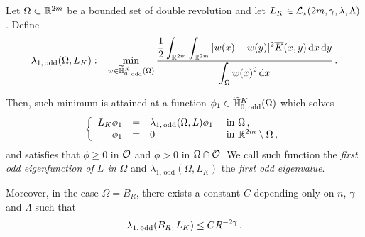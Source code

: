 \begin{lemma}
	\label{Lemma:FirstOddEigenfunction}
	Let $\Omega\subset \mathbb{R}^{2m} $ be a bounded set of double revolution and let $L_K\in \mathcal{L}_\star(2m,\gamma,\lambda, \Lambda)$. Define 
	\begin{equation}
	\label{Eq:DefLambda1}
	\lambda_{1, \, \mathrm{odd}}(\Omega, L_K) := \min_{w \in \widetilde{\mathbb{H}}^K_{0, \, \mathrm{odd}}(\Omega)} \dfrac{\dfrac{1}{2}  \displaystyle\int_{\mathbb{R}^{2m}} \int_{\mathbb{R}^{2m}} |w(x) - w(y)|^2 \overline{K}(x,y) \,\mathrm{d} x \,\mathrm{d} y}{ \displaystyle \int_\Omega w(x)^2 \,\mathrm{d} x}\,.
	\end{equation}
	
	Then, such minimum is attained at a function $\phi_1\in \widetilde{\mathbb{H}}^K_{0, \, \mathrm{odd}}(\Omega)$ which solves
	$$
	\left\{\begin{array}{rcll}
	L_K \phi_1 &=& \lambda_{1, \, \mathrm{odd}}(\Omega, L) \phi_1 & \textrm{ in } \Omega\,,\\
	\phi_1 & = & 0 & \textrm{ in } \mathbb{R}^{2m}\setminus \Omega\,,
	\end{array} \right.
	$$
	and satisfies that $\phi \geq 0$ in $\mathcal{O}$ and $\phi > 0$ in $\Omega \cap \mathcal{O}$.
	We call such function the \emph{first odd eigenfunction of $L$ in $\Omega$} and $\lambda_{1, \, \mathrm{odd}}(\Omega, L_K) $ the \emph{first odd eigenvalue}. 
	
	Moreover, in the case $\Omega = B_R$, there exists a constant $C$ depending only on $n$, $\gamma$ and $\Lambda$ such that
	$$
	\lambda_{1, \, \mathrm{odd}}(B_R, L_K) \leq C R^{-2\gamma}\,. 
	$$ 
\end{lemma}


